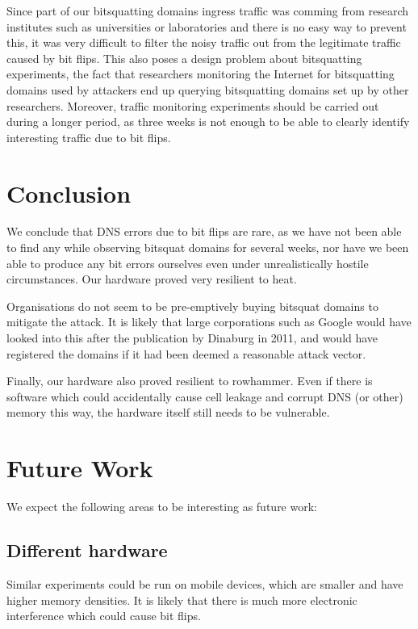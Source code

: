 \documentclass[conference]{IEEEtran}
\begin{document}
Since part of our bitsquatting domains ingress traffic was comming from
research institutes such as universities or laboratories and there is no easy
way to prevent this, it was very difficult to filter the noisy traffic out from
the legitimate traffic caused by bit flips. This also poses a design problem
about bitsquatting experiments, the fact that researchers monitoring the
Internet for bitsquatting domains used by attackers end up querying
bitsquatting domains set up by other researchers. Moreover, traffic monitoring
experiments should be carried out during a longer period, as three weeks is not
enough to be able to clearly identify interesting traffic due to bit flips.


\section{Conclusion}\label{sec:conc}

We conclude that DNS errors due to bit flips are rare, as we have not been able
to find any while observing bitsquat domains for several weeks, nor have we
been able to produce any bit errors ourselves even under unrealistically
hostile circumstances. Our hardware proved very resilient to heat.

Organisations do not seem to be pre-emptively buying bitsquat domains to
mitigate the attack. It is likely that large corporations such as Google would
have looked into this after the publication by Dinaburg in 2011, and would have
registered the domains if it had been deemed a reasonable attack vector.

Finally, our hardware also proved resilient to rowhammer. Even if there is
software which could accidentally cause cell leakage and corrupt DNS (or other)
memory this way, the hardware itself still needs to be vulnerable.


\section{Future Work}\label{sec:futwork}

We expect the following areas to be interesting as future work:

\subsection{Different hardware}

Similar experiments could be run on mobile devices, which are smaller and have
higher memory densities. It is likely that there is much more electronic
interference which could cause bit flips.
\end{document}
